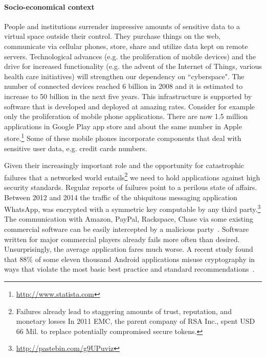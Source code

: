 \documentclass[10pt]{article}
\begin{document}
\paragraph{Socio-economical context}
People and institutions surrender impressive amounts of sensitive data to a virtual space outside
their control.
They purchase things on the web, communicate via cellular phones, store, share and utilize data kept on remote servers.
Technological advances (e.g. the proliferation of mobile devices) and the drive for increased
functionality (e.g. the advent of the Internet of Things, various health care initiatives) will
strengthen our dependency on ``cyberspace".
The number of connected devices reached 6 billion in 2008 and it is estimated to increase to 50
billion in the next five years.
This infrastructure is supported by software that is developed and deployed at amazing rates. 
Consider for example only the proliferation of mobile phone applications.
There are now 1.5 million applications in Google Play app store and about the same
number in Apple store.\footnote{\url{http://www.statista.com}}
Some of these mobile phones incorporate components that deal with sensitive user data, e.g. credit cards numbers.   

Given their increasingly important role and the opportunity for catastrophic failures that a
networked world entails\footnote{
Failures already lead to staggering amounts of trust, reputation, and monetary losses In 2011 EMC,
the parent company of RSA Inc., spent USD 66 Mil. to replace potentially compromised secure tokens.
} we need to hold applications against high security standards.
Regular reports of failures point to a perilous state of affairs. 
Between 2012 and 2014 the traffic of the ubiquitous messaging application \textsf{WhatsApp},
was encrypted with a symmetric key computable by any third
party.\footnote{\url{http://pastebin.com/g9UPuviz}}
The communication with \textsf{Amazon, PayPal, Rackspace, Chase} via some existing commercial
software can be easily intercepted by a malicious party~\cite{GIJABS12}.
Software written for major commercial players already fails more often than desired.  Unsurprisingly, the average
application fares much worse. 
A recent study found that 88\% of some eleven thousand Android applications misuse cryptography in
ways that violate the most basic best practice and standard
recommendations~\cite{egele13anempirical}.
\end{document}
